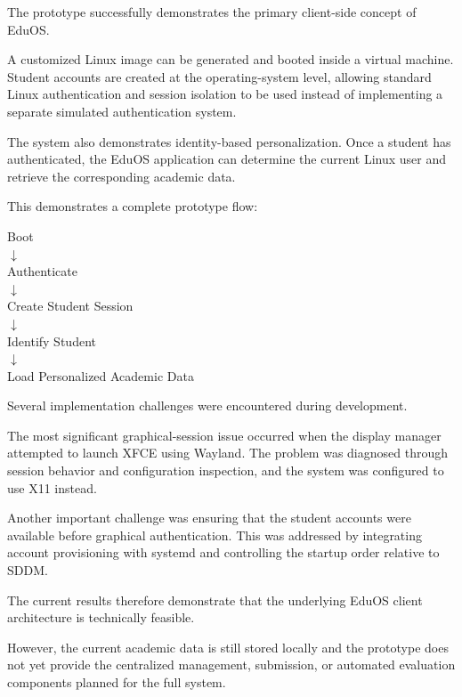 \documentclass{tietreport}
\begin{document}
The prototype successfully demonstrates the primary client-side
concept of EduOS.

A customized Linux image can be generated and booted inside a virtual
machine. Student accounts are created at the operating-system level,
allowing standard Linux authentication and session isolation to be
used instead of implementing a separate simulated authentication
system.

The system also demonstrates identity-based personalization. Once a
student has authenticated, the EduOS application can determine the
current Linux user and retrieve the corresponding academic data.

This demonstrates a complete prototype flow:

\begin{center}
Boot \\[2mm]
$\downarrow$ \\[2mm]
Authenticate \\[2mm]
$\downarrow$ \\[2mm]
Create Student Session \\[2mm]
$\downarrow$ \\[2mm]
Identify Student \\[2mm]
$\downarrow$ \\[2mm]
Load Personalized Academic Data
\end{center}

Several implementation challenges were encountered during
development.

The most significant graphical-session issue occurred when the
display manager attempted to launch XFCE using Wayland. The problem
was diagnosed through session behavior and configuration inspection,
and the system was configured to use X11 instead.

Another important challenge was ensuring that the student accounts
were available before graphical authentication. This was addressed
by integrating account provisioning with systemd and controlling the
startup order relative to SDDM.

The current results therefore demonstrate that the underlying EduOS
client architecture is technically feasible.

However, the current academic data is still stored locally and the
prototype does not yet provide the centralized management,
submission, or automated evaluation components planned for the full
system.


\end{document}
